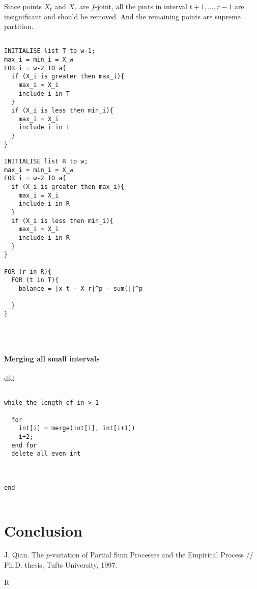 \documentclass[12pt, a4paper]{article}
\numberwithin{equation}{section}
\begin{document}
Since points $X_t$ and $X_r$ are $f$-joint, all the 
pints in interval $t+1,\dots, r-1$ are insignificant and should be removed. And the remaining points are supreme partition.

\begin{lstlisting}

INITIALISE list T to w-1;
max_i = min_i = X_w
FOR i = w-2 TO a{
  if (X_i is greater then max_i){
    max_i = X_i
    include i in T  
  }
  if (X_i is less then min_i){
    max_i = X_i
    include i in T  
  }
}

INITIALISE list R to w;
max_i = min_i = X_w
FOR i = w-2 TO a{
  if (X_i is greater then max_i){
    max_i = X_i
    include i in R  
  }
  if (X_i is less then min_i){
    max_i = X_i
    include i in R  
  }
}

FOR (r in R){
  FOR (t in T){
    balance = |x_t - X_r|^p - sum(||^p
  
  }
}




\end{lstlisting}


\paragraph{Merging all small intervals}
dfd

\begin{lstlisting}

while the length of in > 1
  
  for  
    int[i] = merge(int[i], int[i+1])
    i+2;
  end for
  delete all even int
  
  

end 


\end{lstlisting}

\section{Conclusion}
  
\begin{thebibliography}{99}  
   J. Qian. The $p$-variation of Partial Sum Processes
  and the Empirical Process // Ph.D. thesis, Tufts University, 1997.
  
    R
  
\end{thebibliography}
\end{document}
